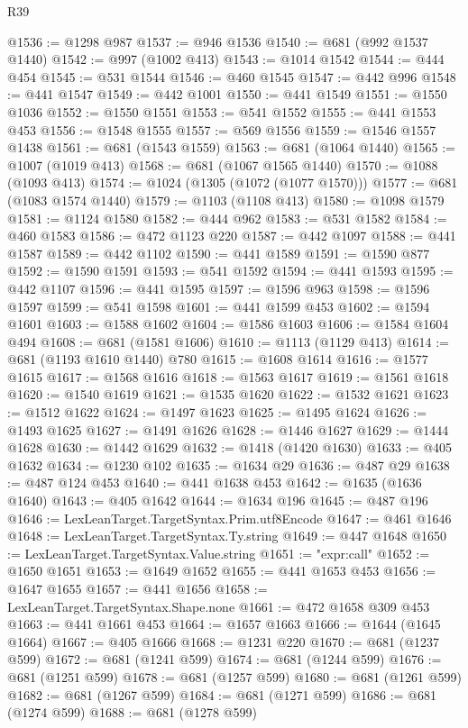 \begin{lexlean}{R39}
\begin{coremodule}
@1536 := @1298 @987
@1537 := @946 @1536
@1540 := @681 (@992 @1537 @1440)
@1542 := @997 (@1002 @413)
@1543 := @1014 @1542
@1544 := @444 @454
@1545 := @531 @1544
@1546 := @460 @1545
@1547 := @442 @996
@1548 := @441 @1547
@1549 := @442 @1001
@1550 := @441 @1549
@1551 := @1550 @1036
@1552 := @1550 @1551
@1553 := @541 @1552
@1555 := @441 @1553 @453
@1556 := @1548 @1555
@1557 := @569 @1556
@1559 := @1546 @1557 @1438
@1561 := @681 (@1543 @1559)
@1563 := @681 (@1064 @1440)
@1565 := @1007 (@1019 @413)
@1568 := @681 (@1067 @1565 @1440)
@1570 := @1088 (@1093 @413)
@1574 := @1024 (@1305 (@1072 (@1077 @1570)))
@1577 := @681 (@1083 @1574 @1440)
@1579 := @1103 (@1108 @413)
@1580 := @1098 @1579
@1581 := @1124 @1580
@1582 := @444 @962
@1583 := @531 @1582
@1584 := @460 @1583
@1586 := @472 @1123 @220
@1587 := @442 @1097
@1588 := @441 @1587
@1589 := @442 @1102
@1590 := @441 @1589
@1591 := @1590 @877
@1592 := @1590 @1591
@1593 := @541 @1592
@1594 := @441 @1593
@1595 := @442 @1107
@1596 := @441 @1595
@1597 := @1596 @963
@1598 := @1596 @1597
@1599 := @541 @1598
@1601 := @441 @1599 @453
@1602 := @1594 @1601
@1603 := @1588 @1602
@1604 := @1586 @1603
@1606 := @1584 @1604 @494
@1608 := @681 (@1581 @1606)
@1610 := @1113 (@1129 @413)
@1614 := @681 (@1193 @1610 @1440) @780
@1615 := @1608 @1614
@1616 := @1577 @1615
@1617 := @1568 @1616
@1618 := @1563 @1617
@1619 := @1561 @1618
@1620 := @1540 @1619
@1621 := @1535 @1620
@1622 := @1532 @1621
@1623 := @1512 @1622
@1624 := @1497 @1623
@1625 := @1495 @1624
@1626 := @1493 @1625
@1627 := @1491 @1626
@1628 := @1446 @1627
@1629 := @1444 @1628
@1630 := @1442 @1629
@1632 := @1418 (@1420 @1630)
@1633 := @405 @1632
@1634 := @1230 @102
@1635 := @1634 @29
@1636 := @487 @29
@1638 := @487 @124 @453
@1640 := @441 @1638 @453
@1642 := @1635 (@1636 @1640)
@1643 := @405 @1642
@1644 := @1634 @196
@1645 := @487 @196
@1646 := LexLeanTarget.TargetSyntax.Prim.utf8Encode
@1647 := @461 @1646
@1648 := LexLeanTarget.TargetSyntax.Ty.string
@1649 := @447 @1648
@1650 := LexLeanTarget.TargetSyntax.Value.string
@1651 := "expr:call"
@1652 := @1650 @1651
@1653 := @1649 @1652
@1655 := @441 @1653 @453
@1656 := @1647 @1655
@1657 := @441 @1656
@1658 := LexLeanTarget.TargetSyntax.Shape.none
@1661 := @472 @1658 @309 @453
@1663 := @441 @1661 @453
@1664 := @1657 @1663
@1666 := @1644 (@1645 @1664)
@1667 := @405 @1666
@1668 := @1231 @220
@1670 := @681 (@1237 @599)
@1672 := @681 (@1241 @599)
@1674 := @681 (@1244 @599)
@1676 := @681 (@1251 @599)
@1678 := @681 (@1257 @599)
@1680 := @681 (@1261 @599)
@1682 := @681 (@1267 @599)
@1684 := @681 (@1271 @599)
@1686 := @681 (@1274 @599)
@1688 := @681 (@1278 @599)

\end{coremodule}
\end{lexlean}
